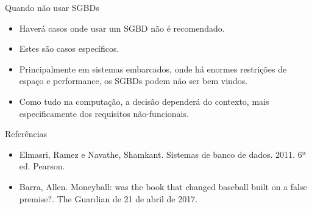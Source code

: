 \documentclass[11pt]{beamer}
\begin{document}
\begin{frame}{Quando não usar SGBDs}
    \begin{itemize}
        \item Haverá casos onde usar um SGBD não é recomendado.
        \item Estes são casos específicos.
        \item Principalmente em sistemas embarcados, onde há enormes restrições de espaço e performance, os SGBDs podem não ser bem vindos.
        \item Como tudo na computação, a decisão dependerá do contexto, mais especificamente dos requisitos não-funcionais.
    \end{itemize}
\end{frame}

\begin{frame}{Referências}
    \begin{itemize}
        \item Elmasri, Ramez e Navathe, Shamkant. Sistemas de banco de dados. 2011. 6ª ed. Pearson.
        \item Barra, Allen. Moneyball: was the book that changed baseball built on a false premise?. The Guardian de 21 de abril de 2017.
    \end{itemize}
\end{frame}
\end{document}

